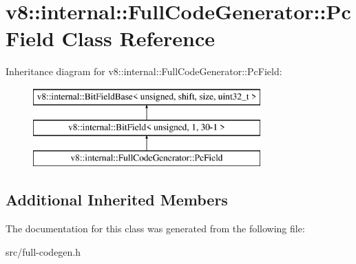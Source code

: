 \hypertarget{classv8_1_1internal_1_1_full_code_generator_1_1_pc_field}{}\section{v8\+:\+:internal\+:\+:Full\+Code\+Generator\+:\+:Pc\+Field Class Reference}
\label{classv8_1_1internal_1_1_full_code_generator_1_1_pc_field}
Inheritance diagram for v8\+:\+:internal\+:\+:Full\+Code\+Generator\+:\+:Pc\+Field\+:\begin{figure}[H]
\begin{center}
\leavevmode
\includegraphics[height=3.000000cm]{classv8_1_1internal_1_1_full_code_generator_1_1_pc_field}
\end{center}
\end{figure}
\subsection*{Additional Inherited Members}


The documentation for this class was generated from the following file\+:\begin{DoxyCompactItemize}
\item 
src/full-\/codegen.\+h\end{DoxyCompactItemize}
